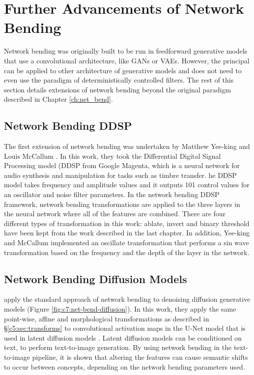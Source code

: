 \section{Further Advancements of Network Bending}

Network bending was originally built to be run in feedforward generative models that use a convolutional architecture, like GANs or VAEs. 
However, the principal can be applied to other architecture of generative models and does not need to even use the paradigm of deterministically controlled filters. 
The rest of this section details extensions of network bending beyond the original paradigm described in Chapter \ref{ch:net_bend}.

\subsection{Network Bending DDSP}
\label{c7:subsubsec:ddsp}


The first extension of network bending was undertaken by Matthew Yee-king and Louis McCallum \citep{mccallum2020network,yee2021studio}. 
In this work, they took the Differential Digital Signal Processing model (DDSP from Google Magenta, which is a neural network for audio synthesis and manipulation for tasks such as timbre transfer. 
he DDSP model takes frequency and amplitude values and it outputs 101 control values for an oscillator and noise filter parameters. 
In the network bending DDSP framework, network bending transformations are applied to the three layers in the neural network where all of the features are combined. 
There are four different types of transformation in this work: ablate, invert and binary threshold have been kept from the work described in the last chapter.
 In addition, Yee-king and McCallum implemented an oscillate transformation that performs a sin wave transformation based on the frequency and the depth of the layer in the network. 

 \subsection{Network Bending Diffusion Models}
 \label{c7:subsec:netbend-diffusion}

 \cite{dzwonczyk2024network} apply the standard approach of network bending to denoising diffusion generative models (Figure \ref{fig:c7:net-bend-diffusion}).
 In this work, they apply the same point-wise, affine and morphological transformations as described in \S \ref{c5:sec:transforms} to convolutional activation maps in the U-Net model \citep{ronneberger2015u} that is used in latent diffusion models \citep{rombach2022high}. 
 Latent diffusion models can be conditioned on text, to perform text-to-image generation.
 By using network bending in the text-to-image pipeline, it is shown that altering the features can cause semantic shifts to occur between concepts, depending on the network bending parameters used.

